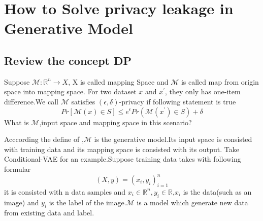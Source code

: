 \documentclass{beamer}
\newcommand{\R}{\mathbb{R}}
\begin{document}
    
    
\section{How to Solve privacy leakage in Generative Model}
\subsection{Review the concept DP}
\begin{frame}
    Suppose $\mathcal{M}:\R^n\to X$,
    X is called mapping Space and $\mathcal M$
     is called map from origin space into mapping space.
     For two dataset $x$ and $x^\prime$, they only has one-item difference.We call $\mathcal M$ satisfies $(\epsilon,\delta)$-privacy if following statement is true
     \begin{equation}
      Pr[\mathcal{M}(x)\in S] \leq e^{\epsilon}  Pr(\mathcal M(x^\prime )\in  S) +\delta
     \end{equation}
     What is $\mathcal M$,input space and mapping space in this scenario?
\end{frame}
\begin{frame}
  Acccording the define of \cite{ref1},$\mathcal{M}$ is the generative model.Its input space is consisted with training data and its mapping space is consisted with its output.
  Take Conditional-VAE for an example.Suppose training data takes with following formular
  \begin{equation}
    (X,y) = {(x_i,y_i)}_{i=1}^n
  \end{equation}
  it is consisted with n data samples and $x_i\in \R^n,y_i\in \R$,$x_i$ is the data(such as an image) and $y_i$ is the label of the image.$\mathcal M$ is a model which generate new data from existing data and label.

\end{frame}
\end{document}
